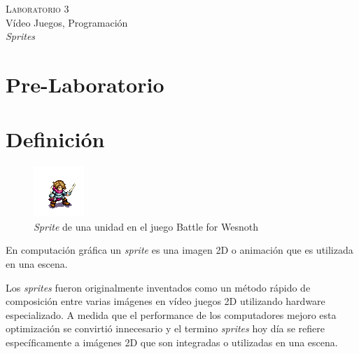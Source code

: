 \begin{center}
\textsc{\Large Laboratorio 3}~\\
{\large Vídeo Juegos, Programación}~\\
\emph{Sprites}
\end{center}

\section{Pre-Laboratorio}

\section{Definición}
\begin{figure}
\includegraphics[width=\linewidth]{semana3/sprite_ej1.png} 
\caption{\emph{Sprite} de una unidad en el juego Battle for Wesnoth \cite{wesnothgame}}
\end{figure}

En computación gráfica un \emph{sprite} es una imagen 2D o animación que es utilizada en una escena.

Los \emph{sprites} fueron originalmente inventados como un método rápido de composición entre varias imágenes en vídeo juegos 2D utilizando hardware especializado. A medida que el performance de los computadores mejoro esta optimización se convirtió innecesario y el termino \emph{sprites} hoy día se refiere específicamente a imágenes 2D que son integradas o utilizadas en una escena.


